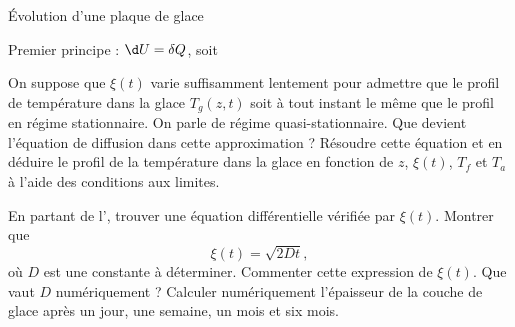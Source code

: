\begin{exo}[PC][3][TD]{Évolution d'une plaque de glace}
\begin{quest}
{ Premier principe : $\d U = \delta Q$, soit
}

  \item On suppose que $\xi(t)$ varie suffisamment lentement pour admettre que le profil de température dans la glace $T_g(z,t)$ soit à tout instant le même que le profil en régime stationnaire. On parle de régime quasi-stationnaire. %
  Que devient l'équation de diffusion  dans cette approximation ? Résoudre cette équation et en déduire le profil de la température dans la glace en fonction de $z$, $\xi(t)$, $T_f$ et $T_a$ à l'aide des conditions aux limites.%



  \item En partant de l', trouver une équation différentielle vérifiée par $\xi(t)$. Montrer que
\begin{equation}
\xi(t)=\sqrt{2Dt},
  \end{equation}
où $D$ est une constante à déterminer. Commenter cette expression de $\xi(t)$. Que vaut $D$ numériquement ?
Calculer numériquement l'épaisseur de la couche de glace après un jour, une semaine, un mois et six mois.

\end{quest}

\end{exo}

